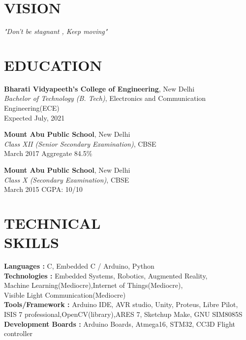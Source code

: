 \documentclass[margin]{res}
\begin{document}
\begin{resume}

\section{VISION}
{\sl "Don't be stagnant , Keep moving" }

\section{EDUCATION}
\textbf{Bharati Vidyapeeth's College of Engineering}, New Delhi\\
{\sl Bachelor of Technology (B. Tech)}, Electronics and Communication Engineering(ECE)\\
Expected July, 2021


\textbf{Mount Abu Public School}, New Delhi \\
{\sl Class XII (Senior Secondary Examination)}, CBSE\\
March 2017
\hfill Aggregate 84.5\%

\textbf{Mount Abu Public School}, New Delhi \\
{\sl Class X (Secondary Examination)}, CBSE\\
March 2015
\hfill CGPA: 10/10



\section{TECHNICAL\\SKILLS}

\textbf{Languages : } C, Embedded C / Arduino, Python
\\
\textbf{Technologies :} Embedded Systems, Robotics, Augmented Reality, \\               Machine Learning(Mediocre),Internet of Things(Mediocre),\\ Visible Light Communication(Mediocre)
\\
\textbf{Tools/Framework : } Arduino IDE, AVR studio, Unity, Proteus, Libre Pilot,
ISIS 7 professional,OpenCV(library),ARES 7,
Sketchup Make, GNU SIM8085S
\\
\textbf{Development Boards : }Arduino Boards, Atmega16, STM32, CC3D Flight controller


\end{resume}
\end{document}
